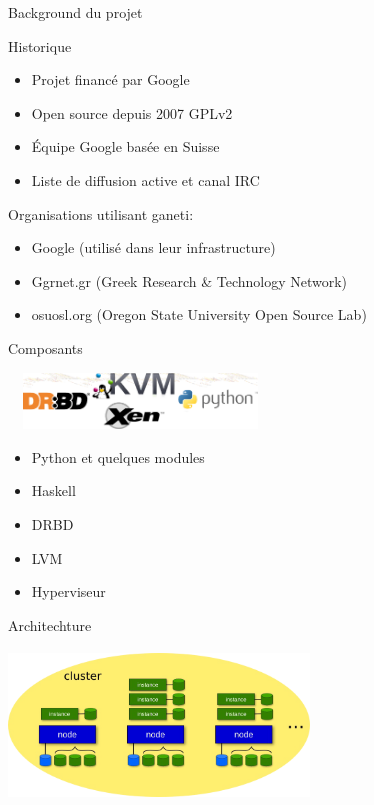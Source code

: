 \begin{frame}{Background du projet}
\begin{block}{Historique}
  \begin{itemize}
  \item Projet financé par Google
\pause
  \item Open source depuis 2007 GPLv2
\pause
  \item Équipe Google basée en Suisse
\pause
  \item Liste de diffusion active et canal IRC
\pause
  \end{itemize}
\end{block}
\begin{block}{Organisations utilisant ganeti:}
  \begin{itemize}
  \item Google (utilisé dans leur infrastructure)
\pause
  \item Ggrnet.gr (Greek Research \& Technology Network)
\pause
  \item osuosl.org (Oregon State University Open Source Lab)
  \end{itemize}
\end{block}
\end{frame}

\begin{frame}{Composants}
\begin{center}
  \includegraphics[width=7cm,height=1.5cm]{images_presentation/module.png}
\end{center}
\begin{itemize}
\item Python et quelques modules
\pause
\item Haskell
\pause
\item DRBD
\pause
\item LVM
\pause
\item Hyperviseur
\end{itemize}
\end{frame}

\begin{frame}{Architechture}
\begin{center}
  \includegraphics[width=8cm,height=4cm]{images_presentation/archi1.png}
\end{center}
\end{frame}

